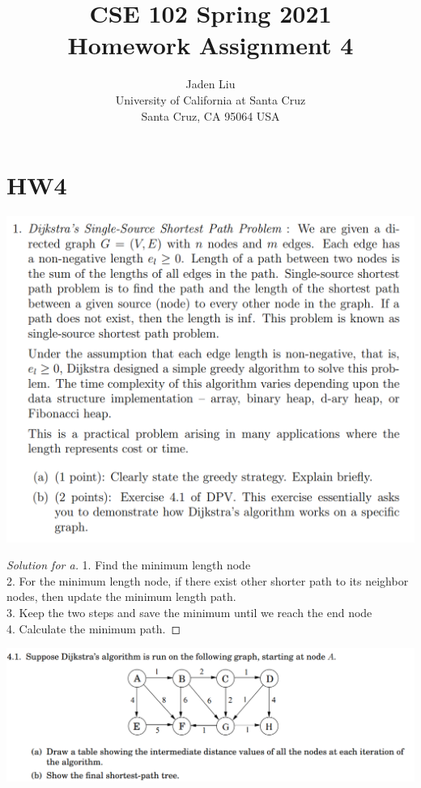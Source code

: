 \documentclass[12pt]{article}
\begin{document}
\title{ CSE 102 Spring 2021\\
	Homework Assignment 4}

\author{Jaden Liu \\ 
University of California at Santa Cruz\\
Santa Cruz, CA 95064 USA }

\maketitle


\section{HW4} 
\includegraphics[scale=0.39]{1.png}
\begin{proof}[Solution for a]
	1. Find the minimum length node\\
	2. For the minimum length node, if there exist other shorter path to its neighbor nodes, then update the minimum length path.\\
	3. Keep the two steps and save the minimum until we reach the end node\\
	4. Calculate the minimum path.
\end{proof}
\includegraphics[scale=0.37]{1_1.png}
\end{document}
